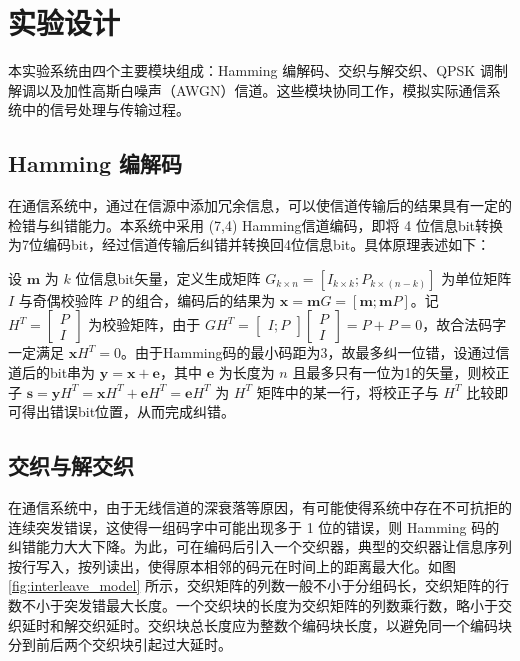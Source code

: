 \section{实验设计}

本实验系统由四个主要模块组成：Hamming 编解码、交织与解交织、QPSK 调制解调以及加性高斯白噪声（AWGN）信道。这些模块协同工作，模拟实际通信系统中的信号处理与传输过程。

\subsection{Hamming 编解码}

在通信系统中，通过在信源中添加冗余信息，可以使信道传输后的结果具有一定的检错与纠错能力。本系统中采用 (7,4) Hamming信道编码，即将 4 位信息bit转换为7位编码bit，经过信道传输后纠错并转换回4位信息bit。具体原理表述如下：

设 $\bm{m}$ 为 $k$ 位信息bit矢量，定义生成矩阵 $G_{k\times n}=[I_{k\times k}; P_{k\times(n-k)}]$ 为单位矩阵 $I$ 与奇偶校验阵 $P$ 的组合，编码后的结果为 $\bm{x}=\bm{m}G=[\bm{m};\bm{m}P]$。记 $H^T=\begin{bmatrix}P\\I\end{bmatrix}$ 为校验矩阵，由于 $GH^T=\begin{bmatrix}I;P\end{bmatrix}\begin{bmatrix}P\\I\end{bmatrix}=P+P=0$，故合法码字一定满足 $\bm{x}H^T=0$。由于Hamming码的最小码距为3，故最多纠一位错，设通过信道后的bit串为 $\bm{y}=\bm{x}+\bm{e}$，其中 $\bm{e}$ 为长度为 $n$ 且最多只有一位为1的矢量，则校正子 $\bm{s}=\bm{y}H^T=\bm{x}H^T+\bm{e}H^T=\bm{e}H^T$ 为 $H^T$ 矩阵中的某一行，将校正子与 $H^T$ 比较即可得出错误bit位置，从而完成纠错。

\subsection{交织与解交织}

在通信系统中，由于无线信道的深衰落等原因，有可能使得系统中存在不可抗拒的连续突发错误，这使得一组码字中可能出现多于 1 位的错误，则 Hamming 码的纠错能力大大下降。为此，可在编码后引入一个交织器，典型的交织器让信息序列按行写入，按列读出，使得原本相邻的码元在时间上的距离最大化。如图 \ref{fig:interleave_model} 所示，交织矩阵的列数一般不小于分组码长，交织矩阵的行数不小于突发错最大长度。一个交织块的长度为交织矩阵的列数乘行数，略小于交织延时和解交织延时。交织块总长度应为整数个编码块长度，以避免同一个编码块分到前后两个交织块引起过大延时。

